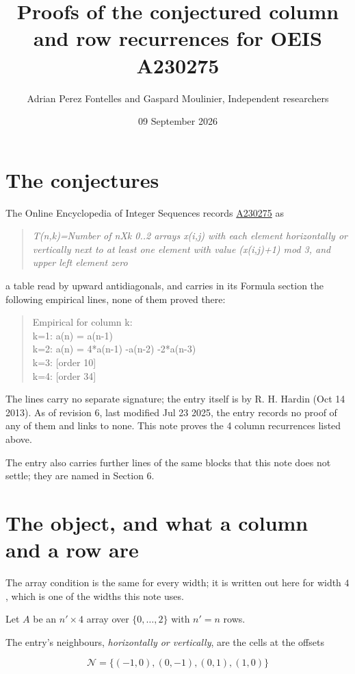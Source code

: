 \documentclass[11pt]{article}
\title{Proofs of the conjectured column and row recurrences for OEIS A230275}
\author{Adrian Perez Fontelles and Gaspard Moulinier, Independent researchers}
\date{09 September 2026}
\theoremstyle{definition}
\begin{document}
\maketitle
\section{The conjectures}

The Online Encyclopedia of Integer Sequences records \href{https://oeis.org/A230275}{A230275} as

\begin{quote}\itshape T(n,k)=Number of nXk 0..2 arrays x(i,j) with each element horizontally or vertically next to at least one element with value (x(i,j)+1) mod 3, and upper left element zero\end{quote}

a table read by upward antidiagonals, and carries in its Formula section the following empirical lines, none of them proved there:

\begin{quote}\ttfamily Empirical for column k:\\
k=1: a(n) = a(n-1)\\k=2: a(n) = 4*a(n-1) -a(n-2) -2*a(n-3)\\k=3: [order 10]\\k=4: [order 34]\end{quote}

The lines carry no separate signature; the entry itself is by R. H. Hardin (Oct 14 2013). As of revision 6, last modified Jul 23 2025, the entry records no proof of any of them and links to none. This note proves the 4 column recurrences listed above.

The entry also carries further lines of the same blocks that this note does not settle; they are named in Section 6.

\section{The object, and what a column and a row are}

The array condition is the same for every width; it is written out here for width $4$, which is one of the widths this note uses.

Let $A$ be an $n' \times 4$ array over $\{0,\dots,2\}$ with $n' = n$ rows.

The entry's neighbours, {\itshape horizontally or vertically}, are the cells at the offsets

\[\mathcal{N} = \{(-1,0), (0,-1), (0,1), (1,0)\}\]
\end{document}
